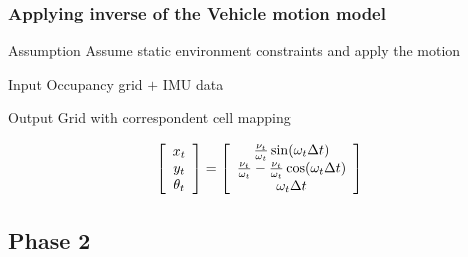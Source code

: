 \documentclass{beamer}
\begin{document}
	\begin{frame}
		\frametitle{Applying inverse of the Vehicle motion model}
		
		\begin{block}{Assumption}		
		Assume static environment constraints and apply the motion
		\end{block}		
		
		\begin{exampleblock}{Input}		
		Occupancy grid $+$ IMU data
		\end{exampleblock}

		\begin{alertblock}{Output}		
		Grid with correspondent cell mapping
		\end{alertblock}

		\begin{equation}
		\left[\begin{array}{c}x_t \\ y_t\\ \theta_t \end{array} \right] = 
		\left[\begin{array}{c} {\nu_t \over \omega_t} \sin(\omega_t \Delta t) \\ {\nu_t \over \omega_t} - {\nu_t \over \omega_t} \cos(\omega_t \Delta t) \\ \omega_t \Delta t \end{array}\right]
		\label{eq:circularmotion}
		\end{equation}
	\end{frame}	

\subsection{Phase 2}
\end{document}
